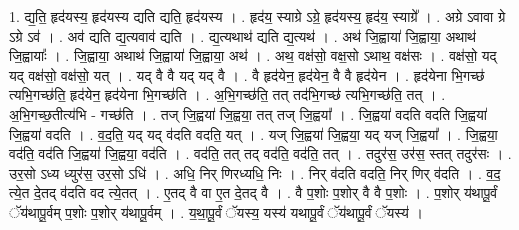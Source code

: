 \documentclass[17pt]{extarticle}
\begin{document}
1. द्य॒ति॒ हृद॑यस्य॒ हृद॑यस्य द्यति द्यति॒ हृद॑यस्य । . हृद॑य॒ स्याग्रे ऽग्रे॒ हृद॑यस्य॒ हृद॑य॒ स्याग्रे᳚ । . अग्रे ऽवावा ग्रे ऽग्रे ऽव॑ । . अव॑ द्यति द्य॒त्यवाव॑ द्यति । . द्य॒त्यथाथ॑ द्यति द्य॒त्यथ॑ । . अथ॑ जि॒ह्वाया॑ जि॒ह्वाया॒ अथाथ॑ जि॒ह्वायाः᳚ । . जि॒ह्वाया॒ अथाथ॑ जि॒ह्वाया॑ जि॒ह्वाया॒ अथ॑ । . अथ॒ वक्ष॑सो॒ वक्ष॒सो ऽथाथ॒ वक्ष॑सः । . वक्ष॑सो॒ यद् यद् वक्ष॑सो॒ वक्ष॑सो॒ यत् । . यद् वै वै यद् यद् वै । . वै हृद॑येन॒ हृद॑येन॒ वै वै हृद॑येन । . हृद॑येना भि॒गच्छ॑ त्यभि॒गच्छ॑ति॒ हृद॑येन॒ हृद॑येना भि॒गच्छ॑ति । . अ॒भि॒गच्छ॑ति॒ तत् तद॑भि॒गच्छ॑ त्यभि॒गच्छ॑ति॒ तत् । . अ॒भि॒गच्छ॒तीत्य॑भि - गच्छ॑ति । . तज् जि॒ह्वया॑ जि॒ह्वया॒ तत् तज् जि॒ह्वया᳚ । . जि॒ह्वया॑ वदति वदति जि॒ह्वया॑ जि॒ह्वया॑ वदति । . व॒द॒ति॒ यद् यद् व॑दति वदति॒ यत् । . यज् जि॒ह्वया॑ जि॒ह्वया॒ यद् यज् जि॒ह्वया᳚ । . जि॒ह्वया॒ वद॑ति॒ वद॑ति जि॒ह्वया॑ जि॒ह्वया॒ वद॑ति । . वद॑ति॒ तत् तद् वद॑ति॒ वद॑ति॒ तत् । . तदुर॑स॒ उर॑स॒ स्तत् तदुर॑सः । . उर॒सो ऽध्य ध्युर॑स॒ उर॒सो ऽधि॑ । . अधि॒ निर् णिरध्यधि॒ निः । . निर् व॑दति वदति॒ निर् णिर् व॑दति । . व॒द॒ त्ये॒त दे॒तद् व॑दति वद त्ये॒तत् । . ए॒तद् वै वा ए॒त दे॒तद् वै । . वै प॒शोः प॒शोर् वै वै प॒शोः । . प॒शोर् य॑थापू॒र्वं ॅय॑थापू॒र्वम् प॒शोः प॒शोर् य॑थापू॒र्वम् । . य॒था॒पू॒र्वं ॅयस्य॒ यस्य॑ यथापू॒र्वं ॅय॑थापू॒र्वं ॅयस्य॑ । \newline
\end{document}
